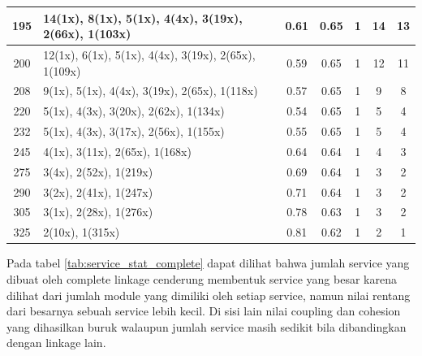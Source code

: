 \begin{small}
\begin{longtable}{|c|p{4cm}|c|c|c|c|c|}
195 & 14(1x), 8(1x), 5(1x), 4(4x), 3(19x), 2(66x), 1(103x) & 0.61 & 0.65 & 1 & 14 & 13 \\   \hline
200 & 12(1x), 6(1x), 5(1x), 4(4x), 3(19x), 2(65x), 1(109x) & 0.59 & 0.65 & 1 & 12 & 11 \\   \hline
208 & 9(1x), 5(1x), 4(4x), 3(19x), 2(65x), 1(118x) & 0.57 & 0.65 & 1 & 9 & 8 \\   \hline
220 & 5(1x), 4(3x), 3(20x), 2(62x), 1(134x) & 0.54 & 0.65 & 1 & 5 & 4 \\   \hline
232 & 5(1x), 4(3x), 3(17x), 2(56x), 1(155x) & 0.55 & 0.65 & 1 & 5 & 4 \\   \hline
245 & 4(1x), 3(11x), 2(65x), 1(168x) & 0.64 & 0.64 & 1 & 4 & 3 \\   \hline
275 & 3(4x), 2(52x), 1(219x) & 0.69 & 0.64 & 1 & 3 & 2 \\   \hline
290 & 3(2x), 2(41x), 1(247x) & 0.71 & 0.64 & 1 & 3 & 2 \\   \hline
305 & 3(1x), 2(28x), 1(276x) & 0.78 & 0.63 & 1 & 3 & 2 \\   \hline
325 & 2(10x), 1(315x) & 0.81 & 0.62 & 1 & 2 & 1 \\   \hline
	\end{longtable}
\end{small}
\endgroup

Pada tabel \ref{tab:service_stat_complete} dapat dilihat bahwa jumlah service yang dibuat oleh complete linkage cenderung membentuk service yang besar karena dilihat dari jumlah module yang dimiliki oleh setiap service, namun nilai rentang dari besarnya sebuah service lebih kecil. Di sisi lain nilai coupling dan cohesion yang dihasilkan buruk walaupun jumlah service masih sedikit bila dibandingkan dengan linkage lain.

